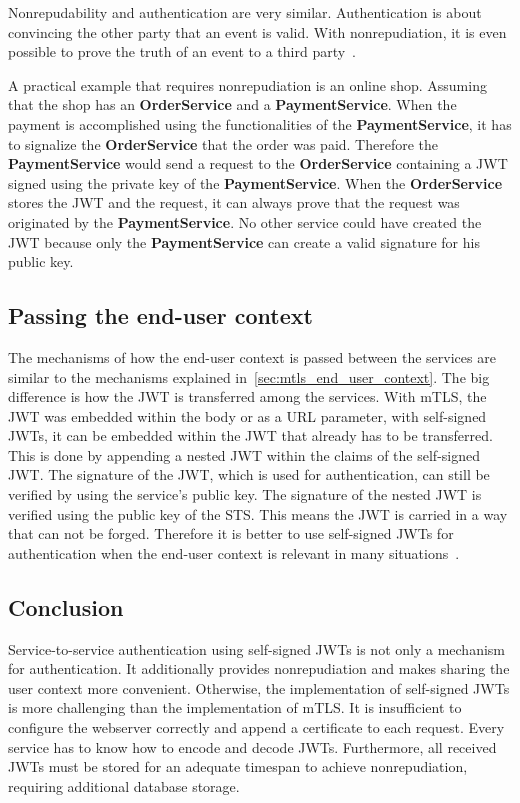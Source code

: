 Nonrepudability and authentication are very similar.
Authentication is about convincing the other party that an event is valid.
With nonrepudiation, it is even possible to prove the truth of an event to a third party~\cite{wu20131200}.

A practical example that requires nonrepudiation is an online shop.
Assuming that the shop has an \textbf{OrderService} and a \textbf{PaymentService}.
When the payment is accomplished using the functionalities of the \textbf{PaymentService}, it has to signalize the \textbf{OrderService} that the order was paid.
Therefore the \textbf{PaymentService} would send a request to the \textbf{OrderService} containing a JWT signed using the private key of the \textbf{PaymentService}.
When the \textbf{OrderService} stores the JWT and the request, it can always prove that the request was originated by the \textbf{PaymentService}.
No other service could have created the JWT because only the \textbf{PaymentService} can create a valid signature for his public key.

\subsection{Passing the end-user context}
The mechanisms of how the end-user context is passed between the services are similar to the mechanisms explained in~\ref{sec:mtls_end_user_context}.
The big difference is how the JWT is transferred among the services.
With mTLS, the JWT was embedded within the body or as a URL parameter, with self-signed JWTs, it can be embedded within the JWT that already has to be transferred.
This is done by appending a nested JWT within the claims of the self-signed JWT.
The signature of the JWT, which is used for authentication, can still be verified by using the service's public key.
The signature of the nested JWT is verified using the public key of the STS.
This means the JWT is carried in a way that can not be forged.
Therefore it is better to use self-signed JWTs for authentication when the end-user context is relevant in many situations~\cite{dias2020microservices}.

\subsection{Conclusion}
Service-to-service authentication using self-signed JWTs is not only a mechanism for authentication. It additionally provides nonrepudiation and makes sharing the user context more convenient. 
Otherwise, the implementation of self-signed JWTs is more challenging than the implementation of mTLS.
It is insufficient to configure the webserver correctly and append a certificate to each request.
Every service has to know how to encode and decode JWTs.
Furthermore, all received JWTs must be stored for an adequate timespan to achieve nonrepudiation, requiring additional database storage.

